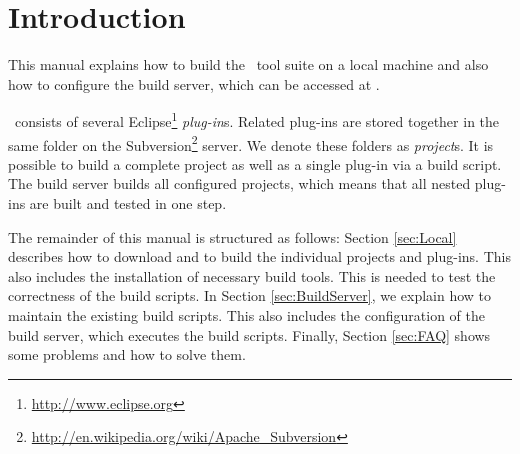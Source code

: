 \section{Introduction}
This manual explains how to build the \EASy\ tool suite on a local machine and also how to configure the build server, which can be accessed at \Jenkins.

\EASy\ consists of several Eclipse\footnote{\url{http://www.eclipse.org}} \textit{plug-in}s. Related plug-ins are stored together in the same folder on the Subversion\footnote{\url{http://en.wikipedia.org/wiki/Apache_Subversion}} server. We denote these folders as \textit{project}s. It is possible to build a complete project as well as a single plug-in via a build script. The build server builds all configured projects, which means that all nested plug-ins are built and tested in one step.

The remainder of this manual is structured as follows: Section \ref{sec:Local} describes how to download and to build the individual projects and plug-ins. This also includes the installation of necessary build tools. This is needed to test the correctness of the build scripts. In Section \ref{sec:BuildServer}, we explain how to maintain the existing build scripts. This also includes the configuration of the build server, which executes the build scripts. Finally, Section \ref{sec:FAQ} shows some problems and how to solve them.